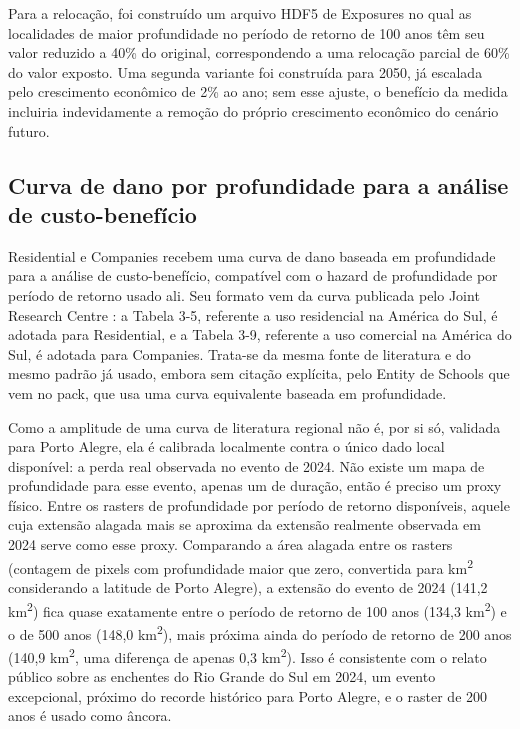 \documentclass[11pt]{article}
\begin{document}
Para a relocação, foi construído um arquivo HDF5 de Exposures no qual as localidades de
maior profundidade no período de retorno de 100 anos têm seu valor reduzido a 40\% do
original, correspondendo a uma relocação parcial de 60\% do valor exposto. Uma segunda
variante foi construída para 2050, já escalada pelo crescimento econômico de 2\% ao ano;
sem esse ajuste, o benefício da medida incluiria indevidamente a remoção do próprio
crescimento econômico do cenário futuro.

\subsection{Curva de dano por profundidade para a análise de custo-benefício}
\label{sec:curva-profundidade}

Residential e Companies recebem uma curva de dano baseada em profundidade para a análise
de custo-benefício, compatível com o hazard de profundidade por período de retorno usado
ali. Seu formato vem da curva publicada pelo Joint Research Centre \citep{huizinga2017}: a
Tabela 3-5, referente a uso residencial na América do Sul, é adotada para Residential, e a
Tabela 3-9, referente a uso comercial na América do Sul, é adotada para Companies. Trata-se
da mesma fonte de literatura e do mesmo padrão já usado, embora sem citação explícita, pelo
Entity de Schools que vem no pack, que usa uma curva equivalente baseada em profundidade.

Como a amplitude de uma curva de literatura regional não é, por si só, validada para Porto
Alegre, ela é calibrada localmente contra o único dado local disponível: a perda real
observada no evento de 2024. Não existe um mapa de profundidade para esse evento, apenas
um de duração, então é preciso um proxy físico. Entre os rasters de profundidade por
período de retorno disponíveis, aquele cuja extensão alagada mais se aproxima da extensão
realmente observada em 2024 serve como esse proxy. Comparando a área alagada entre os
rasters (contagem de pixels com profundidade maior que zero, convertida para
km\textsuperscript{2} considerando a latitude de Porto Alegre), a extensão do evento de
2024 (141,2 km\textsuperscript{2}) fica quase exatamente entre o período de retorno de 100
anos (134,3 km\textsuperscript{2}) e o de 500 anos (148,0 km\textsuperscript{2}), mais
próxima ainda do período de retorno de 200 anos (140,9 km\textsuperscript{2}, uma
diferença de apenas 0,3 km\textsuperscript{2}). Isso é consistente com o relato público
sobre as enchentes do Rio Grande do Sul em 2024, um evento excepcional, próximo do recorde
histórico para Porto Alegre, e o raster de 200 anos é usado como âncora.
\end{document}

